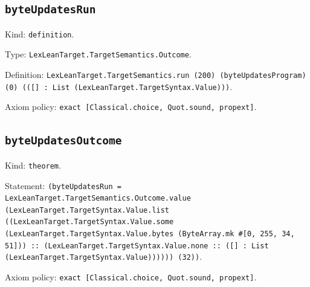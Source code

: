 \documentclass[11pt]{article}
\begin{document}
\subsection*{\texttt{byteUpdatesRun}}
\noindent Kind: \texttt{definition}.\par
\noindent Type: \texttt{LexLeanTarget.TargetSemantics.Outcome}.\par
\noindent Definition: \texttt{LexLeanTarget.TargetSemantics.run (200) (byteUpdatesProgram) (0) (([] : List (LexLeanTarget.TargetSyntax.Value)))}.\par
\noindent Axiom policy: \texttt{exact [Classical.choice, Quot.sound, propext]}.\par
\subsection*{\texttt{byteUpdatesOutcome}}
\noindent Kind: \texttt{theorem}.\par
\noindent Statement: \texttt{(byteUpdatesRun = LexLeanTarget.TargetSemantics.Outcome.value (LexLeanTarget.TargetSyntax.Value.list ((LexLeanTarget.TargetSyntax.Value.some (LexLeanTarget.TargetSyntax.Value.bytes (ByteArray.mk \#[0, 255, 34, 51])) :: (LexLeanTarget.TargetSyntax.Value.none :: ([] : List (LexLeanTarget.TargetSyntax.Value)))))) (32))}.\par
\noindent Axiom policy: \texttt{exact [Classical.choice, Quot.sound, propext]}.\par
\end{document}
